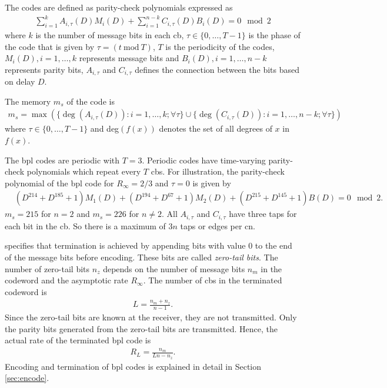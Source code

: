 The codes are defined as parity-check polynomials expressed as
\begin{align}
\sum_{i=1}^{k}A_{i,\tau}(D)M_i(D)+\sum_{i=1}^{n-k}C_{i,\tau}(D)B_i(D)=0\mod 2
\end{align}
where $k$ is the number of message bits in each \ac{cb}, $\tau \in \{0,\dots,T-1\}$ is the phase of the code that is given by $\tau=(t\ \text{mod}\ T)$, $T$ is the periodicity of the codes, $M_i(D),i=1,\dots,k$ represents message bits and $B_i(D),i=1,\dots,n-k$ represents parity bits, $A_{i,\tau}$ and $C_{i,\tau}$ defines the connection between the bits based on delay $D$.

The memory $m_s$ of the code is
\begin{align}
m_s=\max\left(\{\deg(A_{i,\tau}(D)):i=1,\dots,k;\forall\tau\}\cup\{\deg(C_{i,\tau}(D)):i=1,\dots,n-k;\forall\tau\}\right)
\end{align}
where $\tau \in \{0,\dots,T-1\}$ and deg$(f(x))$ denotes the set of all degrees of $x$ in $f(x)$.

The \ac{bpl} codes are periodic with $T=3$. Periodic codes have time-varying parity-check polynomials which repeat every $T$ \acp{cb}. For illustration, the parity-check polynomial of the \ac{bpl} code for $R_\infty=2/3$ and $\tau=0$ is given by
\begin{align}
&(D^{214}+D^{185}+1)M_1(D)+(D^{194}+D^{67}+1)M_2(D)+(D^{215}+D^{145}+1)B(D)=0\mod 2.
\end{align}
$m_s=215$ for $n=2$ and $m_s=226$ for $n\neq2$. All $A_{i,\tau}$ and $C_{i,\tau}$ have three taps for each bit in the \ac{cb}. So there is a maximum of $3n$ taps or edges per \ac{cn}.

\cite{Bpl} specifies that termination is achieved by appending bits with value $0$ to the end of the message bits before encoding. These bits are called \emph{zero-tail bits}. The number of zero-tail bits $n_z$ depends on the number of message bits $n_m$ in the codeword and the asymptotic rate $R_\infty$. The number of \acp{cb} in the terminated codeword is \begin{align}L=\frac{n_m+n_z}{n-1}.\end{align} Since the zero-tail bits are known at the receiver, they are not transmitted. Only the parity bits generated from the zero-tail bits are transmitted. Hence, the actual rate of the terminated \ac{bpl} code is
\begin{align}\label{eq:rate_term}
R_L=\frac{n_m}{Ln-n_z}.
\end{align}
Encoding and termination of \ac{bpl} codes is explained in detail in Section \ref{sec:encode}.

